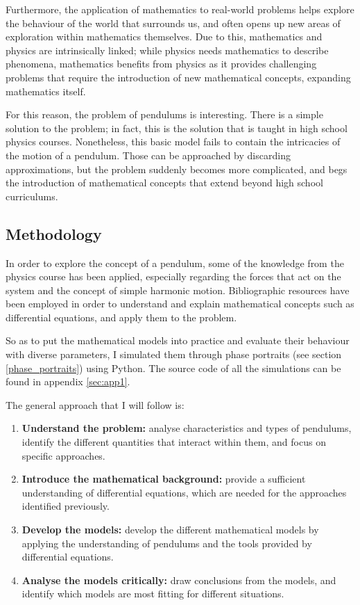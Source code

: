 \documentclass[12pt, a4paper, titlepage]{article}
\theoremstyle{definition}
\numberwithin{equation}{section}
\theoremstyle{definition}
\theoremstyle{definition}
\begin{document}
Furthermore, the application of mathematics to real-world problems helps explore the behaviour of the world that surrounds us, and often opens up new areas of exploration within mathematics themselves. Due to this, mathematics and physics are intrinsically linked; while physics needs mathematics to describe phenomena, mathematics benefits from physics as it provides challenging problems that require the introduction of new mathematical concepts, expanding mathematics itself.

For this reason, the problem of pendulums is interesting. There is a simple solution to the problem; in fact, this is the solution that is taught in high school physics courses. Nonetheless, this basic model fails to contain the intricacies of the motion of a pendulum. Those can be approached by discarding approximations, but the problem suddenly becomes more complicated, and begs the introduction of mathematical concepts that extend beyond high school curriculums.

\subsection{Methodology}
In order to explore the concept of a pendulum, some of the knowledge from the physics course has been applied, especially regarding the forces that act on the system and the concept of simple harmonic motion. Bibliographic resources have been employed in order to understand and explain mathematical concepts such as differential equations, and apply them to the problem.

So as to put the mathematical models into practice and evaluate their behaviour with diverse parameters, I simulated them through phase portraits (see section \ref{phase_portraits}) using Python. The source code of all the simulations can be found in appendix \ref{sec:app1}.

The general approach that I will follow is:
\begin{enumerate}
\item \textbf{Understand the problem:} analyse characteristics and types of pendulums, identify the different quantities that interact within them, and focus on specific approaches.
\item \textbf{Introduce the mathematical background:} provide a sufficient understanding of differential equations, which are needed for the approaches identified previously.
\item \textbf{Develop the models:} develop the different mathematical models by applying the understanding of pendulums and the tools provided by differential equations.
\item \textbf{Analyse the models critically:} draw conclusions from the models, and identify which models are most fitting for different situations.
\end{enumerate}
\end{document}
